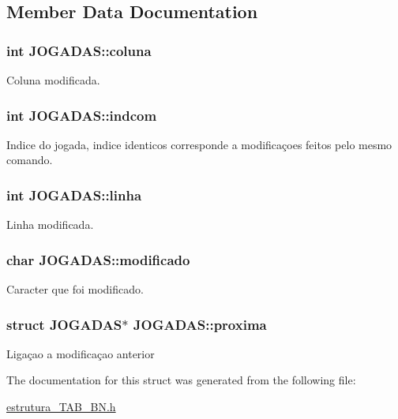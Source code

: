 \subsection{Member Data Documentation}
\hypertarget{structJOGADAS_a28827d11a796524d7c3f836a34a9b28c}{
\subsubsection[{coluna}]{\setlength{\rightskip}{0pt plus 5cm}int J\-O\-G\-A\-D\-A\-S\-::coluna}}\label{structJOGADAS_a28827d11a796524d7c3f836a34a9b28c}
Coluna modificada. \hypertarget{structJOGADAS_a206a51faab310b88ead47ae8bd45c005}{
\subsubsection[{indcom}]{\setlength{\rightskip}{0pt plus 5cm}int J\-O\-G\-A\-D\-A\-S\-::indcom}}\label{structJOGADAS_a206a51faab310b88ead47ae8bd45c005}
Indice do jogada, indice identicos corresponde a modificaçoes feitos pelo mesmo comando. \hypertarget{structJOGADAS_a967eba2150e21971402055c08864f81e}{
\subsubsection[{linha}]{\setlength{\rightskip}{0pt plus 5cm}int J\-O\-G\-A\-D\-A\-S\-::linha}}\label{structJOGADAS_a967eba2150e21971402055c08864f81e}
Linha modificada. \hypertarget{structJOGADAS_a66f982d3f9fb083c8289819db4e1f892}{
\subsubsection[{modificado}]{\setlength{\rightskip}{0pt plus 5cm}char J\-O\-G\-A\-D\-A\-S\-::modificado}}\label{structJOGADAS_a66f982d3f9fb083c8289819db4e1f892}
Caracter que foi modificado. \hypertarget{structJOGADAS_a5e94fadbce9d65532b484d6d36bbce7d}{
\subsubsection[{proxima}]{\setlength{\rightskip}{0pt plus 5cm}struct {\bf J\-O\-G\-A\-D\-A\-S}$\ast$ J\-O\-G\-A\-D\-A\-S\-::proxima}}\label{structJOGADAS_a5e94fadbce9d65532b484d6d36bbce7d}
Ligaçao a modificaçao anterior 

The documentation for this struct was generated from the following file\-:\begin{DoxyCompactItemize}
\item 
\hyperlink{estrutura__TAB__BN_8h}{estrutura\-\_\-\-T\-A\-B\-\_\-\-B\-N.\-h}\end{DoxyCompactItemize}
